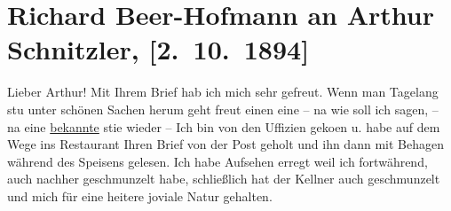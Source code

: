

         
         \renewcommand{\erwaehntePersonen}{Personen: Hermann Bahr, Richard Beer-Hofmann,  Guercino}
         \renewcommand{\erwaehnteInstitutionen}{Institutionen: Die Zeit. Wiener Wochenschrift}
         \renewcommand{\erwaehnteOrte}{Orte: Florenz, Mailand, Rom, Uffizien, Wien}
         \renewcommand{\erwaehnteWerke}{Werke: Die Verstoßung der Hagar}
               \section[Richard Beer-Hofmann an Arthur Schnitzler, {[}2. 10. 1894{]}]{ Richard Beer-Hofmann an Arthur Schnitzler, {[}2. 10. 1894{]}}\nopagebreak{}\rehead{ }\begin{ledgroupsized}[t]{13cm}\normalsize\beginnumbering{} \toendnotes[C]{\smallbreak\pagebreak[2]} 
\toendnotes[C]{\smallbreak}\pstart
           \noindent{}{\pb}Lieber Arthur! Mit Ihrem Brief hab ich mich sehr gefreut. Wenn man
               Tagelang stu{\geminationm} unter schönen Sachen herum geht freut
               einen eine – na wie soll ich sagen, – na eine \uline{bekannte} sti{\geminationm}e wieder –\pend
           \pstart
           Ich bin von den Uffizien geko{\geminationm}en u. habe auf dem Wege ins Restaurant {\pb}Ihren Brief von der Post geholt und
               ihn dann mit Behagen während des Speisens gelesen. Ich habe Aufsehen erregt weil ich
               fortwährend, auch nachher geschmunzelt habe, schließlich hat der Kellner auch
               geschmunzelt und mich für eine heitere joviale Natur gehalten.\pend

\end{ledgroupsized}
